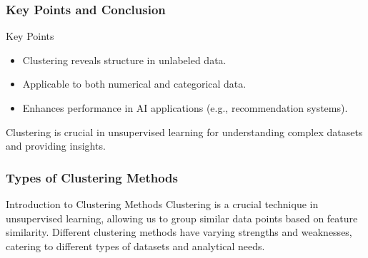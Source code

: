 \documentclass[aspectratio=169]{beamer}
\begin{document}
\begin{frame}[fragile]
    \frametitle{Key Points and Conclusion}
    \begin{block}{Key Points}
        \begin{itemize}
            \item Clustering reveals structure in unlabeled data.
            \item Applicable to both numerical and categorical data.
            \item Enhances performance in AI applications (e.g., recommendation systems).
        \end{itemize}
    \end{block}
    \vspace{0.5cm}
    Clustering is crucial in unsupervised learning for understanding complex datasets and providing insights. 
\end{frame}

\begin{frame}[fragile]
    \frametitle{Types of Clustering Methods}
    \begin{block}{Introduction to Clustering Methods}
        Clustering is a crucial technique in unsupervised learning, allowing us to group similar data points based on feature similarity. Different clustering methods have varying strengths and weaknesses, catering to different types of datasets and analytical needs.
    \end{block}
\end{frame}
\end{document}
